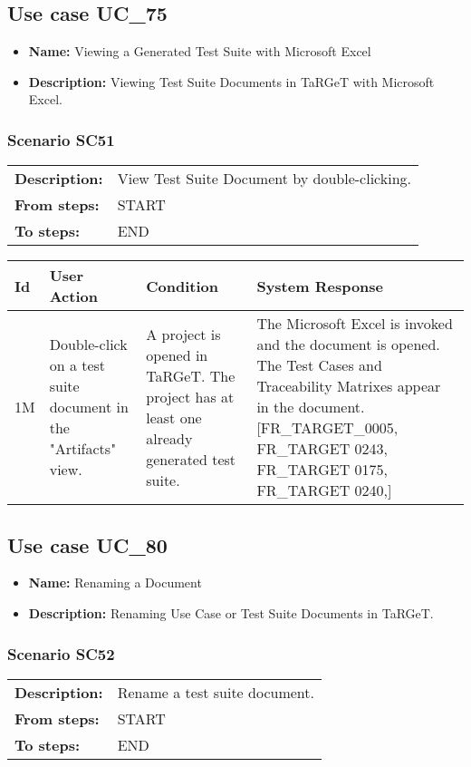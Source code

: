 \documentclass[a4paper,11pt]{article}
\newcommand{\bl}{\\ \hline}
\begin{document}
\subsection*{Use case UC_75}
\begin{itemize}
\item {\bf Name: }Viewing a Generated Test Suite with Microsoft Excel
\item {\bf Description: } Viewing Test Suite Documents in TaRGeT with Microsoft
				Excel.
\end{itemize}
\subsubsection*{Scenario SC51}
\begin{tabular}{p{1in}p{4in}}
{\bf Description:} & View Test Suite Document by double-clicking.
				 \\
{\bf From steps:} & START \\
{\bf To steps:} & END \\
\end{tabular}
 
\begin{tabular}{|p{0.8in}|p{1.6in}|p{1.6in}|p{1.6in}|}
\hline
Id & User Action & Condition & System Response  \bl 
1M & Double-click on a test suite document in the "Artifacts"
						view. & A project is opened in TaRGeT. The project has at least
						one already generated test suite. & The Microsoft Excel is invoked and the document is
						opened. The Test Cases and Traceability Matrixes appear in the
						document.[FR_TARGET_0005, FR_TARGET 0243, FR_TARGET 0175,
						FR_TARGET 0240,] \bl 
\end{tabular}
\subsection*{Use case UC_80}
\begin{itemize}
\item {\bf Name: }Renaming a Document
\item {\bf Description: }Renaming Use Case or Test Suite Documents in TaRGeT.
			
\end{itemize}
\subsubsection*{Scenario SC52}
\begin{tabular}{p{1in}p{4in}}
{\bf Description:} & Rename a test suite document. \\
{\bf From steps:} & START \\
{\bf To steps:} & END \\
\end{tabular}
 
\end{document}
